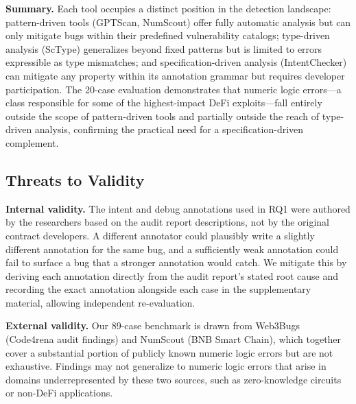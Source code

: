 \documentclass[pdflatex,sn-basic]{sn-jnl}%
\theoremstyle{thmstyleone}%
\theoremstyle{thmstyletwo}%
\theoremstyle{thmstylethree}%
\begin{document}
\smallskip
\noindent\textbf{Summary.}
Each tool occupies a distinct position in the detection landscape:
pattern-driven tools (GPTScan, NumScout) offer fully automatic analysis but can only mitigate bugs within their predefined vulnerability catalogs;
type-driven analysis (ScType) generalizes beyond fixed patterns but is limited to errors expressible as type mismatches;
and specification-driven analysis (IntentChecker) can mitigate any property within its annotation grammar but requires developer participation.
The 20-case evaluation demonstrates that numeric logic errors---a class responsible for some of the highest-impact DeFi exploits---fall entirely outside the scope of pattern-driven tools and partially outside the reach of type-driven analysis, confirming the practical need for a specification-driven complement.

\subsection{Threats to Validity}\label{sec:threats}

\noindent\textbf{Internal validity.}
The intent and debug annotations used in RQ1 were authored by the researchers based on the audit report descriptions, not by the original contract developers.
A different annotator could plausibly write a slightly different annotation for the same bug, and a sufficiently weak annotation could fail to surface a bug that a stronger annotation would catch.
We mitigate this by deriving each annotation directly from the audit report's stated root cause and recording the exact annotation alongside each case in the supplementary material, allowing independent re-evaluation.

\smallskip
\noindent\textbf{External validity.}
Our 89-case benchmark is drawn from Web3Bugs (Code4rena audit findings) and NumScout (BNB Smart Chain), which together cover a substantial portion of publicly known numeric logic errors but are not exhaustive.
Findings may not generalize to numeric logic errors that arise in domains underrepresented by these two sources, such as zero-knowledge circuits or non-DeFi applications.
\end{document}
